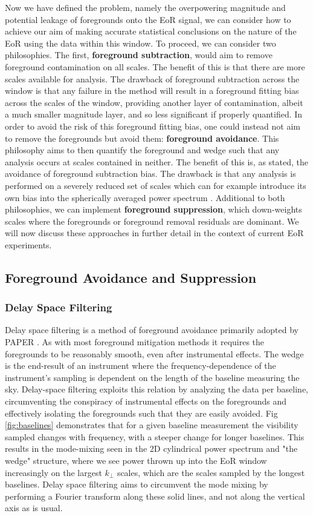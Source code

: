 Now we have defined the problem, namely the overpowering magnitude and potential leakage of foregrounds onto the EoR signal, we can consider how to achieve our aim of making accurate statistical conclusions on the nature of the EoR using the data within this window. To proceed, we can consider two philosophies. The first, \textbf{foreground subtraction}, would aim to remove foreground contamination on all scales. The benefit of this is that there are more scales available for analysis. The drawback of foreground subtraction across the window is that any failure in the method will result in a foreground fitting bias across the scales of the window, providing another layer of contamination, albeit a much smaller magnitude layer, and so less significant if properly quantified. In order to avoid the risk of this foreground fitting bias, one could instead not aim to remove the foregrounds but avoid them: \textbf{foreground avoidance}. This philosophy aims to then quantify the foreground and wedge such that any analysis occurs at scales contained in neither. The benefit of this is, as stated, the avoidance of foreground subtraction bias. The drawback is that any analysis is performed on a severely reduced set of scales which can for example introduce its own bias into the spherically averaged power spectrum \citep{Jensen2016MNRAS.456...66J}. Additional to both philosophies, we can implement \textbf{foreground suppression}, which down-weights scales where the foregrounds or foreground removal residuals are dominant. We will now discuss these approaches in further detail in the context of current EoR experiments.

\subsection{Foreground Avoidance and Suppression}
\subsubsection{Delay Space Filtering}
Delay space filtering is a method of foreground avoidance primarily adopted by PAPER \citep{Parsons2010AJ....139.1468P}. As with most foreground mitigation methods it requires the foregrounds to be reasonably smooth, even after instrumental effects. The wedge is the end-result of an instrument where the frequency-dependence of the instrument's sampling is dependent on the length of the baseline measuring the sky. Delay-space filtering exploits this relation by analyzing the data per baseline, circumventing the conspiracy of instrumental effects on the foregrounds and effectively isolating the foregrounds such that they are easily avoided. Fig \ref{fig:baselines} demonstrates that for a given baseline measurement the visibility sampled changes with frequency, with a steeper change for longer baselines. This results in the mode-mixing seen in the 2D cylindrical power spectrum and "the wedge" structure, where we see power thrown up into the EoR window increasingly on the largest $k_\bot$ scales, which are the scales sampled by the longest baselines. Delay space filtering aims to circumvent the mode mixing by performing a Fourier transform along these solid lines, and not along the vertical axis as is usual.

